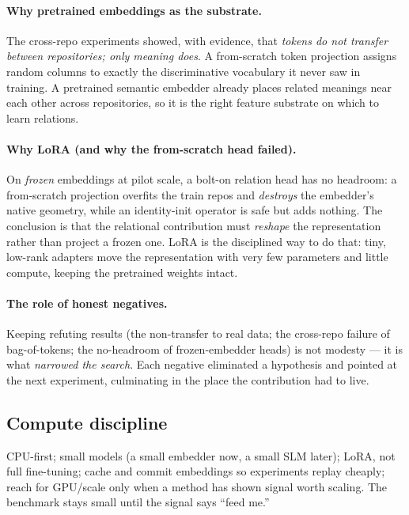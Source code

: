 \documentclass[11pt]{article}
\begin{document}
\paragraph{Why pretrained embeddings as the substrate.}
The cross-repo experiments showed, with evidence, that \emph{tokens do not transfer
between repositories; only meaning does}. A from-scratch token projection assigns
random columns to exactly the discriminative vocabulary it never saw in training. A
pretrained semantic embedder already places related meanings near each other across
repositories, so it is the right feature substrate on which to learn relations.

\paragraph{Why LoRA (and why the from-scratch head failed).}
On \emph{frozen} embeddings at pilot scale, a bolt-on relation head has no headroom:
a from-scratch projection overfits the train repos and \emph{destroys} the
embedder's native geometry, while an identity-init operator is safe but adds
nothing. The conclusion is that the relational contribution must \emph{reshape} the
representation rather than project a frozen one. LoRA is the disciplined way to do
that: tiny, low-rank adapters move the representation with very few parameters and
little compute, keeping the pretrained weights intact.

\paragraph{The role of honest negatives.}
Keeping refuting results (the non-transfer to real data; the cross-repo failure of
bag-of-tokens; the no-headroom of frozen-embedder heads) is not modesty --- it is
what \emph{narrowed the search}. Each negative eliminated a hypothesis and pointed
at the next experiment, culminating in the place the contribution had to live.

\subsection{Compute discipline}

CPU-first; small models (a small embedder now, a small SLM later); LoRA, not full
fine-tuning; cache and commit embeddings so experiments replay cheaply; reach for
GPU/scale only when a method has shown signal worth scaling. The benchmark stays
small until the signal says ``feed me.''
\end{document}
